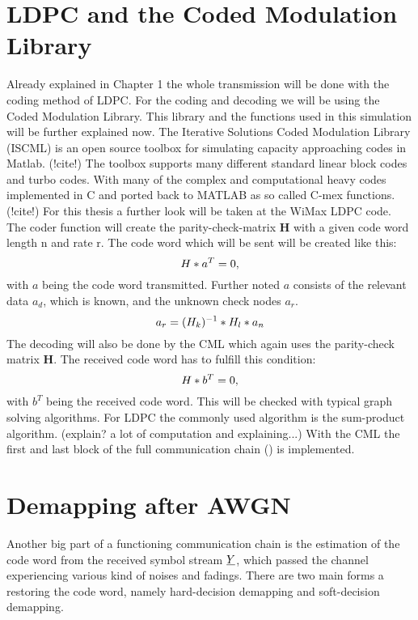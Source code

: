 \section{LDPC and the Coded Modulation Library}
Already explained in Chapter 1 the whole transmission will be done with the coding method of \gls{LDPC}. For the coding and decoding we will be using the Coded Modulation Library. This library and the functions used in this simulation will be further explained now.
\newline
The Iterative Solutions Coded Modulation Library (ISCML) is an open source toolbox for simulating capacity approaching codes in Matlab. (!cite!) The toolbox supports many different standard linear block codes and turbo codes. With many of the complex and computational heavy codes implemented in C and ported back to MATLAB as so called C-mex functions. (!cite!)
\newline 
For this thesis a further look will be taken at the WiMax LDPC code. The coder function will create the parity-check-matrix \textbf{H} with a given code word length n and rate r. The code word which will be sent will be created like this:
\begin{equation}
\label{eq:LDPC1}
\boldmath{H}*a^T = 0,
\end{equation}
with $a$ being the code word transmitted. Further noted $a$ consists of the relevant data $a_{d}$, which is known, and the unknown check nodes $a_{r}$. 
\begin{equation}
\label{eq:LDPC2}
a_r = (\boldmath{H}_k)^{-1} * H_l * a_n
\end{equation}
The decoding will also be done by the \gls{CML} which again uses the parity-check matrix \textbf{H}. The received code word has to fulfill this condition:
\begin{equation}
\label{eq:LDPC3}
\boldmath{H}*b^T = 0,
\end{equation}
with $b^T$ being the received code word. This will be checked with typical graph solving algorithms. For LDPC the commonly used algorithm is the sum-product algorithm. (explain? a lot of computation and explaining...)
With the \gls{CML} the first and last block of the full communication chain () is implemented.
\section{Demapping after AWGN}
Another big part of a functioning communication chain is the estimation of the code word from the received symbol stream $\boldmath\underline{Y}$, which passed the channel experiencing various kind of noises and fadings. There are two main forms a restoring the code word, namely hard-decision demapping and soft-decision demapping.
